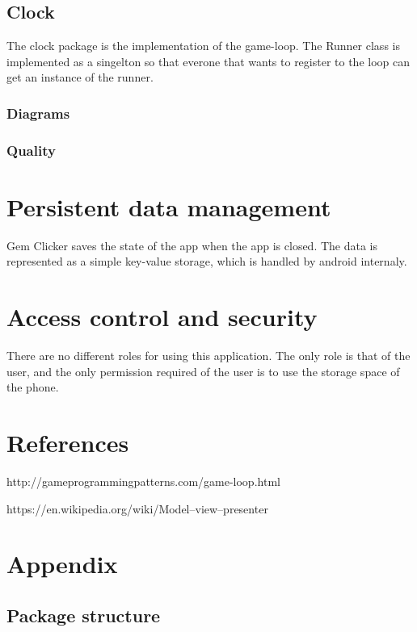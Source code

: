 \documentclass{article}
\begin{document}
\subsection{Clock}
The clock package is the implementation of the game-loop. The Runner class is implemented as a singelton so that everone that wants to register to the loop can get an instance of the runner. 

\subsubsection{Diagrams}

\subsubsection{Quality}

\section{Persistent data management}
Gem Clicker saves the state of the app when the app is closed. 
The data is represented as a simple key-value storage, which is handled by android internaly.

\section{Access control and security}
There are no different roles for using this application. The only role is that of the user,
and the only permission required of the user is to use the storage space of the phone.

\section{References}
\begin{thebibliography}{9}
    
        http://gameprogrammingpatterns.com/game-loop.html
    
        https://en.wikipedia.org/wiki/Model–view–presenter

\end{thebibliography}

\section{Appendix}
\subsection{Package structure}
\begin{center}
\end{center}
\end{document}
